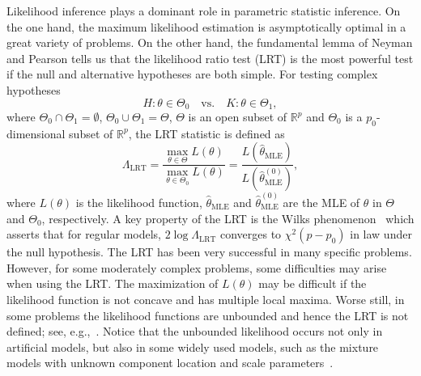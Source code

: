 \documentclass[11pt]{article}
\theoremstyle{plain}
\theoremstyle{definition}
\theoremstyle{remark}
\begin{document}
%
Likelihood inference plays a dominant role in parametric statistic inference.
On the one hand, the maximum likelihood estimation is asymptotically optimal in a great variety of problems.
On the other hand, the fundamental lemma of Neyman and Pearson tells us that the likelihood ratio test (LRT) is the most powerful test if the null and alternative hypotheses are both simple.
For testing complex hypotheses
\begin{equation}\label{eq:newHy}
    H:\theta\in\Theta_0\quad \text{vs.}\quad K: \theta\in \Theta_1,
\end{equation}
where $\Theta_0\cap \Theta_1=\emptyset$, $\Theta_0\cup \Theta_1=\Theta$, $\Theta$ is an open subset of $\mathbb{R}^p$ and $\Theta_0$ is a $p_0$-dimensional subset of $\mathbb{R}^p$,
the LRT statistic is defined as
\begin{equation*}
    \Lambda_{\text{LRT}}=\frac{\max_{\theta\in\Theta}L(\theta)}{\max_{\theta\in\Theta_0} L(\theta)}=\frac{L(\hat{\theta}_{\text{MLE}})}{ L(\hat{\theta}^{(0)}_{\text{MLE}})},
\end{equation*}
where $L(\theta)$ is the likelihood function, $\hat{\theta}_{\text{MLE}}$ and $\hat{\theta}^{(0)}_{\text{MLE}}$ are the MLE of $\theta$ in $\Theta$ and $\Theta_0$, respectively.
A key property of the LRT is the Wilks phenomenon~\citep{Wilks1938The} which asserts that for regular models, $2\log \Lambda_{\text{LRT}}$ converges to $\chi^2(p-p_0)$ in law under the null hypothesis.
The LRT has been very successful in many specific problems.
However, for some moderately complex problems, some difficulties may arise when using the LRT.
The maximization of $L(\theta)$ may be difficult if the likelihood function is not concave and has multiple local maxima.
Worse still, in some problems the likelihood functions are unbounded and hence the LRT is not defined; see, e.g.,~\cite{Cam1990Maximum}.
Notice that the unbounded likelihood occurs not only in artificial models, but also in some widely used models, such as the mixture models with unknown component location and scale parameters~\citep{chenjiahua2017}.
\end{document}
